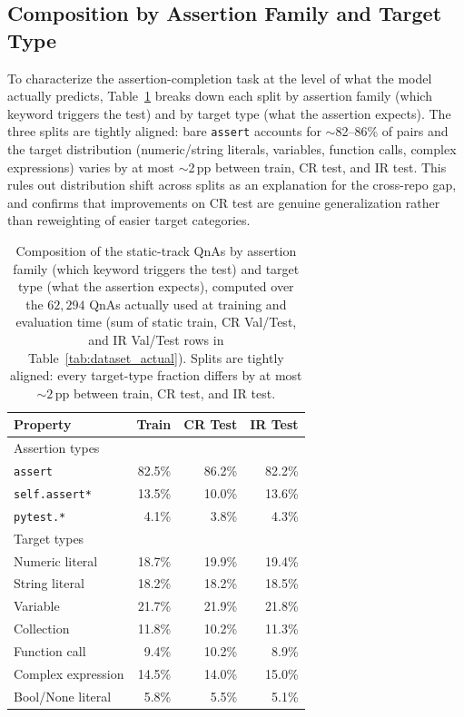 \documentclass{llmxive}
\begin{document}
\subsection{Composition by Assertion Family and Target Type}
\label{app:dataset_composition}

To characterize the assertion-completion task at the level of what the model actually predicts, Table~\ref{tab:dataset_details} breaks down each split by assertion family (which keyword triggers the test) and by target type (what the assertion expects).
The three splits are tightly aligned: bare \texttt{assert} accounts for ${\sim}$82--86\% of pairs and the target distribution (numeric/string literals, variables, function calls, complex expressions) varies by at most ${\sim}$2\,pp between train, CR test, and IR test.
This rules out distribution shift across splits as an explanation for the cross-repo gap, and confirms that improvements on CR test are genuine generalization rather than reweighting of easier target categories.

\begin{table}[t]
\begin{small}
\begin{center}
\begin{tabular}{lrrr}
\toprule
Property & Train & CR Test & IR Test \\
\midrule
Assertion types & & & \\
\quad \texttt{assert} & 82.5\% & 86.2\% & 82.2\% \\
\quad \texttt{self.assert*} & 13.5\% & 10.0\% & 13.6\% \\
\quad \texttt{pytest.*} & 4.1\% & 3.8\% & 4.3\% \\
\midrule
Target types & & & \\
\quad Numeric literal & 18.7\% & 19.9\% & 19.4\% \\
\quad String literal & 18.2\% & 18.2\% & 18.5\% \\
\quad Variable & 21.7\% & 21.9\% & 21.8\% \\
\quad Collection & 11.8\% & 10.2\% & 11.3\% \\
\quad Function call & 9.4\% & 10.2\% & 8.9\% \\
\quad Complex expression & 14.5\% & 14.0\% & 15.0\% \\
\quad Bool/None literal & 5.8\% & 5.5\% & 5.1\% \\
\bottomrule
\end{tabular}


\end{center}
\end{small}
\caption{Composition of the static-track QnAs by assertion family (which keyword triggers the test) and target type (what the assertion expects), computed over the $62{,}294$ QnAs actually used at training and evaluation time (sum of static train, CR Val/Test, and IR Val/Test rows in Table~\ref{tab:dataset_actual}). Splits are tightly aligned: every target-type fraction differs by at most ${\sim}2$\,pp between train, CR test, and IR test.}
\label{tab:dataset_details}
\end{table}
\end{document}
